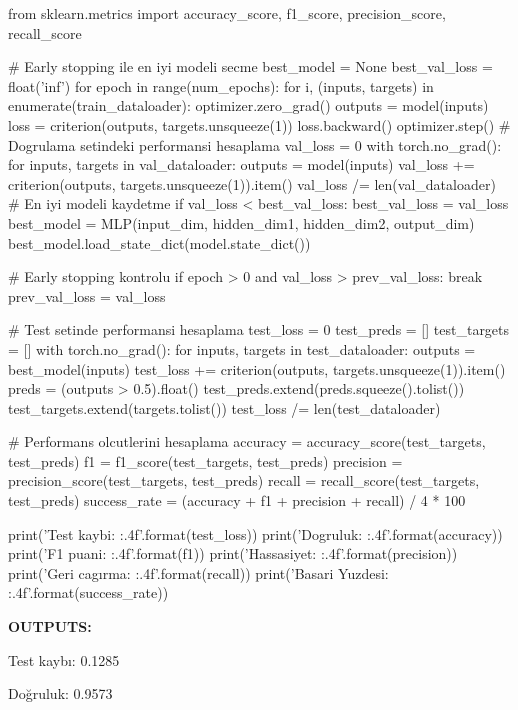 \documentclass[11pt]{article}
\begin{document}
\begin{python}
from sklearn.metrics import accuracy_score, f1_score, precision_score, recall_score

# Early stopping ile en iyi modeli secme
best_model = None
best_val_loss = float('inf')
for epoch in range(num_epochs):
    for i, (inputs, targets) in enumerate(train_dataloader):
        optimizer.zero_grad()
        outputs = model(inputs)
        loss = criterion(outputs, targets.unsqueeze(1))
        loss.backward()
        optimizer.step()
        # Dogrulama setindeki performansi hesaplama
        val_loss = 0
        with torch.no_grad():
            for inputs, targets in val_dataloader:
                outputs = model(inputs)
                val_loss += criterion(outputs, targets.unsqueeze(1)).item()
        val_loss /= len(val_dataloader)
        # En iyi modeli kaydetme
        if val_loss < best_val_loss:
            best_val_loss = val_loss
            best_model = MLP(input_dim, hidden_dim1, hidden_dim2, output_dim)
            best_model.load_state_dict(model.state_dict())

    # Early stopping kontrolu
    if epoch > 0 and val_loss > prev_val_loss:
        break
    prev_val_loss = val_loss

# Test setinde performansi hesaplama
test_loss = 0
test_preds = []
test_targets = []
with torch.no_grad():
    for inputs, targets in test_dataloader:
        outputs = best_model(inputs)
        test_loss += criterion(outputs, targets.unsqueeze(1)).item()
        preds = (outputs > 0.5).float()
        test_preds.extend(preds.squeeze().tolist())
        test_targets.extend(targets.tolist())
test_loss /= len(test_dataloader)

# Performans olcutlerini hesaplama
accuracy = accuracy_score(test_targets, test_preds)
f1 = f1_score(test_targets, test_preds)
precision = precision_score(test_targets, test_preds)
recall = recall_score(test_targets, test_preds)
success_rate = (accuracy + f1 + precision + recall) / 4 * 100

print('Test kaybi: {:.4f}'.format(test_loss))
print('Dogruluk: {:.4f}'.format(accuracy))
print('F1 puani: {:.4f}'.format(f1))
print('Hassasiyet: {:.4f}'.format(precision))
print('Geri cagırma: {:.4f}'.format(recall))
print('Basari Yuzdesi: {:.4f}'.format(success_rate))

\end{python}
\textbf{OUTPUTS:}

Test kaybı: 0.1285

Doğruluk: 0.9573
\end{document}
